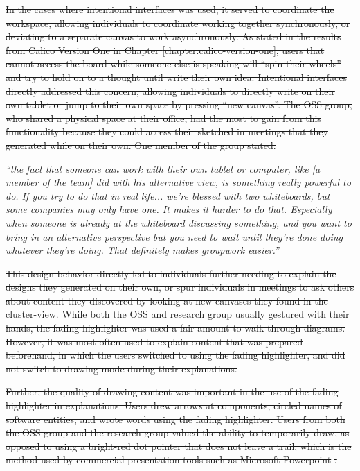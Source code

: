 \documentclass[12pt,fleqn]{ucithesis}
\providecommand{\DIFdeltex}[1]{{\protect\color{red}\sout{#1}}}                      %
\providecommand{\DIFdel}[1]{\texorpdfstring{\DIFdeltex{#1}}{}} %
\begin{document}
\DIFdel{In the cases where intentional interfaces was used, it served to coordinate the workspace, allowing individuals to coordinate working together synchronously, or deviating to a separate canvas to work asynchronously. As stated in the results from Calico Version One in Chapter \ref{chapter:calico-version-one}, users that cannot access the board while someone else is speaking will ``spin their wheels'' and try to hold on to a thought until write their own idea. Intentional interfaces directly addressed this concern, allowing individuals to directly write on their own tablet or jump to their own space by pressing ``new canvas''. The OSS group, who shared a physical space at their office, had the most to gain from this functionality because they could access their sketched in meetings that they generated while on their own. One member of the group stated:
}%

\DIFdel{\emph{``the fact that someone can work with their own tablet or computer, like [a member of the team] did with his alternative view, is something really powerful to do. If you try to do that in real life... we're blessed with two whiteboards, but some companies may only have one. It makes it harder to do that. Especially when someone is already at the whiteboard discussing something, and you want to bring in an alternative perspective but you need to wait until they're done doing whatever they're doing. That definitely makes groupwork easier.''}
}%

\DIFdel{This design behavior directly led to individuals further needing to explain the designs they generated on their own, or spur individuals in meetings to ask others about content they discovered by looking at new canvases they found in the cluster-view. While both the OSS and research group usually gestured with their hands, the fading highlighter was used a fair amount to walk through diagrams. However, it was most often used to explain content that was prepared beforehand, in which the users switched to using the fading highlighter, and did not switch to drawing mode during their explanations. 
}%

\DIFdel{Further, the quality of drawing content was important in the use of the fading highlighter in explanations. Users drew arrows at components, circled names of software entities, and wrote words using the fading highlighter. Users from both the OSS group and the research group valued the ability to temporarily draw, as opposed to using a bright-red dot pointer that does not leave a trail, which is the method used by commercial presentation tools such as Microsoft Powerpoint }%
\DIFdel{.
}%
\end{document}
